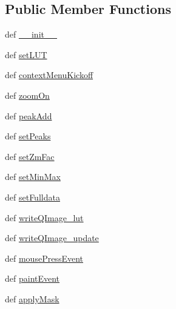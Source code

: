 \subsection*{Public Member Functions}
\begin{DoxyCompactItemize}
\item 
def \hyperlink{classmy_zm_display_1_1my_zm_display_a54641fdc112a59527b6d8f449f7d37c7}{\-\_\-\-\_\-init\-\_\-\-\_\-}
\item 
def \hyperlink{classmy_zm_display_1_1my_zm_display_a217206bd5052930d7d07a909b65dcc0d}{set\-L\-U\-T}
\item 
def \hyperlink{classmy_zm_display_1_1my_zm_display_a97423d0a9d494ceaed4dae284d3d8450}{context\-Menu\-Kickoff}
\item 
def \hyperlink{classmy_zm_display_1_1my_zm_display_a2a6f289f9c749b30a41afddd9a9ccff2}{zoom\-On}
\item 
def \hyperlink{classmy_zm_display_1_1my_zm_display_ae19086d7b292cb945ef88264dcb239e8}{peak\-Add}
\item 
def \hyperlink{classmy_zm_display_1_1my_zm_display_abf543bfb38629b3ac50bb2077cab67cd}{set\-Peaks}
\item 
def \hyperlink{classmy_zm_display_1_1my_zm_display_acbc1fcd19eb140b6b08522900c66197b}{set\-Zm\-Fac}
\item 
def \hyperlink{classmy_zm_display_1_1my_zm_display_a424cb82d1b5af9f171d41b6aa8b4f933}{set\-Min\-Max}
\item 
def \hyperlink{classmy_zm_display_1_1my_zm_display_a236a9fc1081d57f3e8c528be5114d2ca}{set\-Fulldata}
\item 
def \hyperlink{classmy_zm_display_1_1my_zm_display_aa659a4760b6e6cb43c0d5ab6d68a505d}{write\-Q\-Image\-\_\-lut}
\item 
def \hyperlink{classmy_zm_display_1_1my_zm_display_a18fbc9063827c141d9c147ce9d9cafb5}{write\-Q\-Image\-\_\-update}
\item 
def \hyperlink{classmy_zm_display_1_1my_zm_display_a93f20083a078a129b63a75d7a05bfd3a}{mouse\-Press\-Event}
\item 
def \hyperlink{classmy_zm_display_1_1my_zm_display_a4abf307925064f63612b392ba2b5f0e3}{paint\-Event}
\item 
def \hyperlink{classmy_zm_display_1_1my_zm_display_a4a570d23a2199026dd99b659c7f1b15a}{apply\-Mask}
\end{DoxyCompactItemize}
